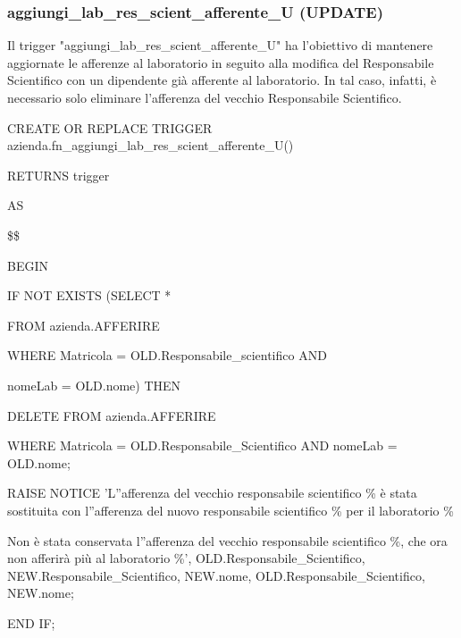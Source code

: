         \subsubsection{aggiungi\_lab\_res\_scient\_afferente\_U (UPDATE)}
        Il trigger "aggiungi\_lab\_res\_scient\_afferente\_U" ha l'obiettivo di mantenere aggiornate le afferenze al laboratorio in seguito alla modifica del Responsabile Scientifico con un dipendente già afferente al laboratorio. In tal caso, infatti, è necessario solo eliminare l'afferenza del vecchio Responsabile Scientifico.
        \ttfamily
            \begin{flushleft}
                \begin{description}
                    \item CREATE OR REPLACE TRIGGER azienda.fn\_aggiungi\_lab\_res\_scient\_afferente\_U()  
                    \item RETURNS trigger
                    \item AS
                    \item \$\$
                    \item BEGIN 
                    \begin{description}
                        \item IF NOT EXISTS (SELECT *
                        \item FROM azienda.AFFERIRE
                        \item WHERE Matricola = OLD.Responsabile\_scientifico AND
                        \item nomeLab = OLD.nome) THEN
                        \begin{description}
                            \item DELETE FROM azienda.AFFERIRE
                            \item WHERE Matricola = OLD.Responsabile\_Scientifico AND nomeLab = OLD.nome;

                            \vspace{0.5cm}

                            \item RAISE NOTICE 'L''afferenza del vecchio responsabile scientifico \% è stata sostituita con l''afferenza del nuovo responsabile scientifico \% per il laboratorio \%
                            \item Non è stata conservata l''afferenza del vecchio responsabile scientifico \%, che ora non afferirà più al laboratorio \%', OLD.Responsabile\_Scientifico, NEW.Responsabile\_Scientifico, NEW.nome, OLD.Responsabile\_Scientifico, NEW.nome;
                        \end{description}
                        \item END IF;


\end{description}
\end{description}
\end{flushleft}
